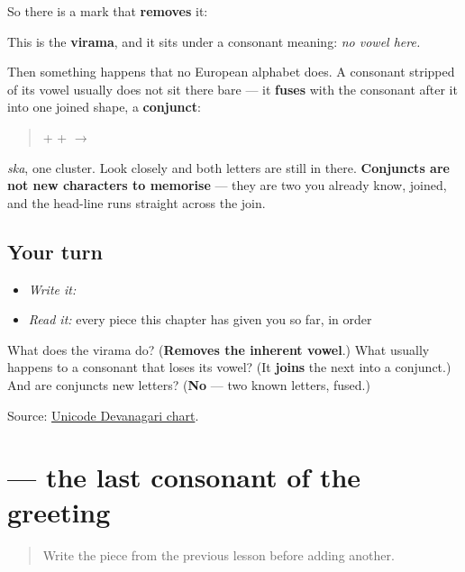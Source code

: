 So there is a mark that \textbf{removes} it:

\begin{quote}
\end{quote}

This is the \textbf{virama}, and it sits under a consonant meaning: \emph{no vowel here.}

Then something happens that no European alphabet does. A consonant stripped of its vowel usually does not sit there bare — it \textbf{fuses} with the consonant after it into one joined shape, a \textbf{conjunct}:

\begin{quote}
\textbf{} + \textbf{} + \textbf{} $\to$ \textbf{}
\end{quote}

\emph{ska}, one cluster. Look closely and both letters are still in there. \textbf{Conjuncts are not new characters to memorise} — they are two you already know, joined, and the head-line runs straight across the join.

\subsection*{Your turn}
\begin{itemize}
\raggedright
  \item \emph{Write it:} 
  \item \emph{Read it:} every piece this chapter has given you so far, in order
\end{itemize}

\begin{tcolorbox}[breakable,colback=teal!4,colframe=teal!35!black,title={Before you move on}]
What does the virama do? (\textbf{Removes the inherent vowel}.) What usually happens to a consonant that loses its vowel? (It \textbf{joins} the next into a conjunct.) And are conjuncts new letters? (\textbf{No} — two known letters, fused.)

Source: \href{https://www.unicode.org/charts/PDF/U0900.pdf}{Unicode Devanagari chart}.
\end{tcolorbox}
\section[ra]{ — the last consonant of the greeting}

\label{lesson:MR-W01-ra}



\begin{quote}
Write the piece from the previous lesson before adding another.
\end{quote}

